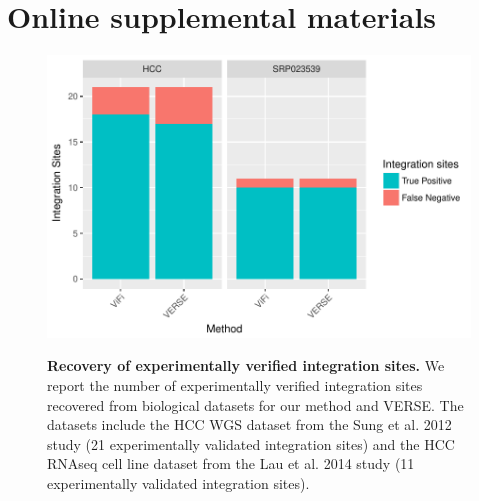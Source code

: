 \documentclass[10pt]{article}
\begin{document}



\section{Online supplemental materials}
\setcounter{figure}{0}
\renewcommand{\thesection}{S.\arabic{section}}   
\renewcommand{\thefigure}{S\arabic{figure}}   
\renewcommand{\thetable}{S\arabic{table}}   

\begin{figure}[htpb]
  \centering
  \includegraphics[width=1\linewidth]{results/hcc.pdf}\\
\caption[Recovery of experimentally verified integration sites from biological datasets.]
{\label{bio_results}  {\bf Recovery of experimentally verified integration sites.}  We report the number of experimentally verified integration sites recovered from biological datasets for our method and VERSE.  The datasets include the HCC WGS dataset from the Sung et al. 2012 study (21 experimentally validated integration sites) and the HCC RNAseq cell line dataset from the Lau et al. 2014 study (11 experimentally validated integration sites).}
\end{figure}

\end{document}
